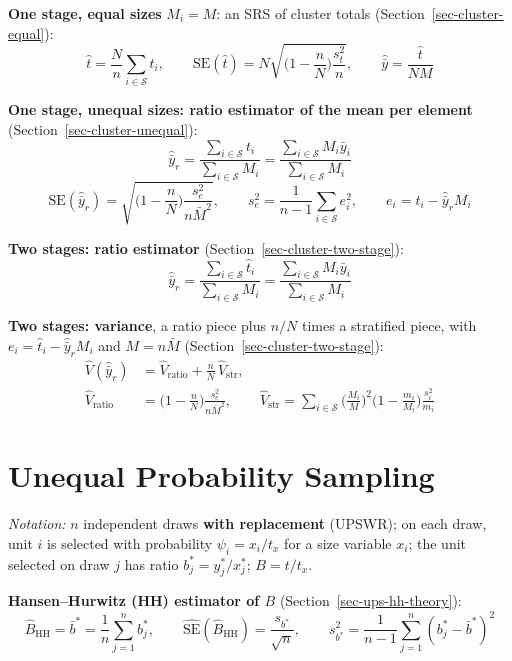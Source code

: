 \documentclass[
  letterpaper,
  DIV=11,
  numbers=noendperiod]{scrreprt}
\renewcommand{\[}{\begin{equation}}
\renewcommand{\]}{\end{equation}}
\begin{document}
\textbf{One stage, equal sizes} \(M_i = M\): an SRS of cluster totals
(Section~\ref{sec-cluster-equal}): \[
\boxed{\hat t = \frac Nn\sum_{i\in\mathcal S} t_i, \qquad
\mathrm{SE}(\hat t) = N\sqrt{\Big(1-\frac nN\Big)\frac{s_t^2}{n}}, \qquad
\hat{\bar y} = \frac{\hat t}{NM}}
\]

\textbf{One stage, unequal sizes: ratio estimator of the mean per
element} (Section~\ref{sec-cluster-unequal}): \[
\boxed{
\hat{\bar y}_r = \frac{\sum_{i\in\mathcal S} t_i}{\sum_{i\in\mathcal S} M_i} = \frac{\sum_{i\in\mathcal S} M_i\bar y_i}{\sum_{i\in\mathcal S} M_i}}
\] \[
\boxed{
\mathrm{SE}(\hat{\bar y}_r) = \sqrt{\Big(1-\frac nN\Big)\frac{s_e^2}{n\bar M^2}}, \qquad
s_e^2 = \frac{1}{n-1}\sum_{i\in\mathcal S}e_i^2, \qquad e_i = t_i-\hat{\bar y}_r M_i}
\]

\textbf{Two stages: ratio estimator}
(Section~\ref{sec-cluster-two-stage}): \[
\boxed{
\hat{\bar y}_r = \frac{\sum_{i\in\mathcal S}\hat t_i}{\sum_{i\in\mathcal S}M_i} = \frac{\sum_{i\in\mathcal S}M_i\bar y_i}{\sum_{i\in\mathcal S}M_i}}
\]

\textbf{Two stages: variance}, a ratio piece plus \(n/N\) times a
stratified piece, with \(e_i = \hat t_i - \hat{\bar y}_r M_i\) and
\(M = n\bar M\) (Section~\ref{sec-cluster-two-stage}): \[
\boxed{\begin{aligned}
\hat V(\hat{\bar y}_r) &= \hat V_{\text{ratio}} + \frac nN\,\hat V_{\text{str}}, \\
\hat V_{\text{ratio}} &= \Big(1-\frac nN\Big)\frac{s_e^2}{n\bar M^2}, \qquad
\hat V_{\text{str}} = \sum_{i\in\mathcal S}\Big(\frac{M_i}{M}\Big)^2\Big(1-\frac{m_i}{M_i}\Big)\frac{s_i^2}{m_i}
\end{aligned}}
\]

\section{Unequal Probability
Sampling}\label{unequal-probability-sampling-1}

\emph{Notation:} \(n\) independent draws \textbf{with replacement}
(UPSWR); on each draw, unit \(i\) is selected with probability
\(\psi_i = x_i/t_x\) for a size variable \(x_i\); the unit selected on
draw \(j\) has ratio \(b_j^* = y_j^*/x_j^*\); \(B = t/t_x\).

\textbf{Hansen--Hurwitz (HH) estimator of \(B\)}
(Section~\ref{sec-ups-hh-theory}): \[
\boxed{\hat{B}_{\mathrm{HH}}=\bar{b}^*=\frac{1}{n}\sum_{j=1}^n b_j^*}, \qquad
\boxed{\widehat{\mathrm{SE}}(\hat{B}_{\mathrm{HH}})=\frac{s_{b^*}}{\sqrt{n}}},\qquad
s_{b^*}^2=\frac{1}{n-1}\sum_{j=1}^n\left(b_j^*-\bar{b}^*\right)^2
\]
\end{document}
